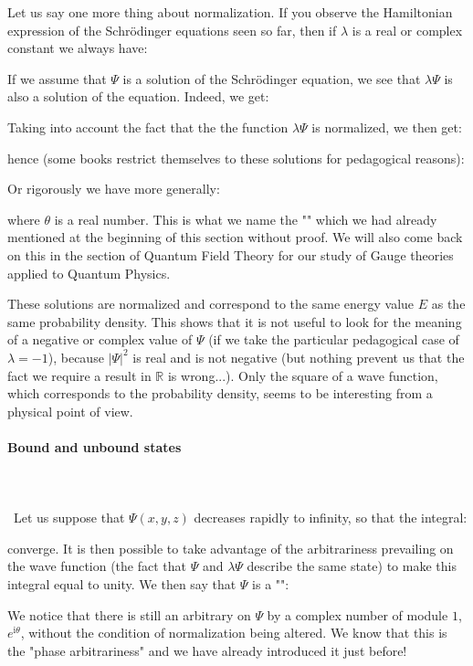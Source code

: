 	Let us say one more thing about normalization. If you observe the Hamiltonian expression of the Schrödinger equations seen so far, then if $\lambda$ is a real or complex constant we always have:
	
	If we assume that $\Psi$ is a solution of the Schrödinger equation, we see that $\lambda\Psi$ is also a solution of the equation. Indeed, we get:
	
	Taking into account the fact that the the function $\lambda\Psi$ is normalized, we then get:
	
	hence (some books restrict themselves to these solutions for pedagogical reasons):
	
	Or rigorously we have more generally:
	
	where $\theta$ is a real number. This is what we name the "" which we had already mentioned at the beginning of this section without proof. We will also come back on this in the section of Quantum Field Theory for our study of Gauge theories applied to Quantum Physics.

	These solutions are normalized and correspond to the same energy value $E$ as the same probability density. This shows that it is not useful to look for the meaning of a negative or complex value of $\Psi$ (if we take the particular pedagogical case of $\lambda=-1$), because $|\Psi|^2$ is real and is not negative (but nothing prevent us that the fact we require a result in $\mathbb{R}$ is wrong...). Only the square of a wave function, which corresponds to the probability density, seems to be interesting from a physical point of view.
	
	\paragraph{Bound and unbound states}\mbox{}\\\\\
	Let us suppose that $\Psi(x,y,z)$ decreases rapidly to infinity, so that the integral:
	
	converge. It is then possible to take advantage of the arbitrariness prevailing on the wave function (the fact that $\Psi$ and $\lambda\Psi$ describe the same state) to make this integral equal to unity. We then say that $\Psi$ is a "":
	
	We notice that there is still an arbitrary on $\Psi$ by a complex number of module $1$, $e^{\mathrm{i}\theta}$, without the condition of normalization being altered. We know that this is the "phase arbitrariness" and we have already introduced it just before!
	
